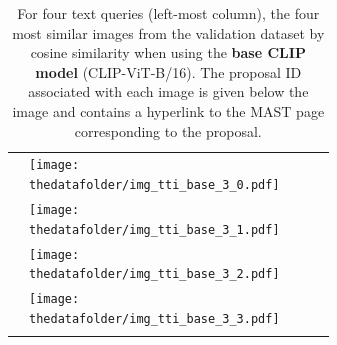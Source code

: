 \documentclass[10pt]{article} %
\newcommand{\SM}[1]{\textcolor{blue}{[SM: #1]}}
\begin{document}
\begin{table}[h!]
\begin{tabular}{m{2.7cm} p{2.9cm} p{2.9cm} p{2.9cm} p{2.9cm}}
      \midrule
      \texttt{} \vspace{20mm} & \centering \texttt{[image: \\thedatafolder/img\_tti\_base\_3\_0.pdf]} \\  & \centering \texttt{[image: \\thedatafolder/img\_tti\_base\_3\_1.pdf]} \\  & \centering \texttt{[image: \\thedatafolder/img\_tti\_base\_3\_2.pdf]} \\  & \centering \texttt{[image: \\thedatafolder/img\_tti\_base\_3\_3.pdf]} \\   \tabularnewline
      \bottomrule
  \end{tabular}
  \caption{For four text queries (left-most column), the four most similar images from the validation dataset by cosine similarity when using the \textbf{\textcolor{deeppurple}{base CLIP model}} (CLIP-ViT-B/16). The proposal ID associated with each image is given below the image and contains a hyperlink to the MAST page corresponding to the proposal.}
  \label{tab:tti_base}
\end{table}


\end{document}
